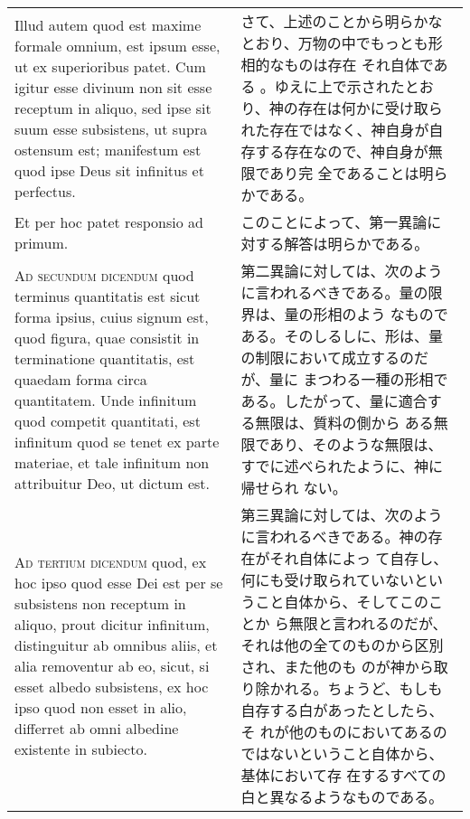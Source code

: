 \documentclass[10pt]{jsarticle} %
\begin{document}
\begin{longtable}{p{21em}p{21em}}
\\


Illud autem quod est maxime formale omnium, est ipsum esse, ut ex
superioribus patet. Cum igitur esse divinum non sit esse receptum in
aliquo, sed ipse sit suum esse subsistens, ut supra ostensum est;
manifestum est quod ipse Deus sit infinitus et perfectus.

&

さて、上述のことから明らかなとおり、万物の中でもっとも形相的なものは存在
それ自体である 。ゆえに上で示されたとおり、神の存在は何かに受け取ら
れた存在ではなく、神自身が自存する存在なので、神自身が無限であり完
全であることは明らかである。

\\



Et per hoc patet responsio ad primum.
&

このことによって、第一異論に対する解答は明らかである。


\\



{\scshape Ad secundum dicendum} quod terminus quantitatis est sicut forma ipsius,
cuius signum est, quod figura, quae consistit in terminatione
quantitatis, est quaedam forma circa quantitatem. Unde infinitum quod
competit quantitati, est infinitum quod se tenet ex parte materiae, et
tale infinitum non attribuitur Deo, ut dictum est.

&

第二異論に対しては、次のように言われるべきである。量の限界は、量の形相のよう
なものである。そのしるしに、形は、量の制限において成立するのだが、量に
まつわる一種の形相である。したがって、量に適合する無限は、質料の側から
ある無限であり、そのような無限は、すでに述べられたように、神に帰せられ
ない。


\\



{\scshape Ad tertium dicendum} quod, ex hoc ipso quod esse Dei est per se
subsistens non receptum in aliquo, prout dicitur infinitum, distinguitur
ab omnibus aliis, et alia removentur ab eo, sicut, si esset albedo
subsistens, ex hoc ipso quod non esset in alio, differret ab omni
albedine existente in subiecto.

&

第三異論に対しては、次のように言われるべきである。神の存在がそれ自体によっ
 て自存し、何にも受け取られていないということ自体から、そしてこのことか
 ら無限と言われるのだが、それは他の全てのものから区別され、また他のも
 のが神から取り除かれる。ちょうど、もしも自存する白があったとしたら、そ
 れが他のものにおいてあるのではないということ自体から、基体において存
 在するすべての白と異なるようなものである。


\end{longtable}
\newpage
{}
\end{document}

